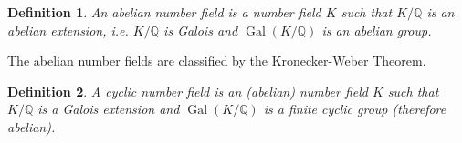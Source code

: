 \documentclass[12pt]{article}
\newtheorem{defn}{Definition}
\theoremstyle{definition}
\newcommand{\Rats}{\mathbb{Q}}
\newcommand{\Gal}{\operatorname{Gal}}
\begin{document}
\begin{defn}
An abelian number field is a number field $K$ such that $K/\Rats$ is an abelian extension, i.e. $K/\Rats$ is Galois and $\Gal(K/\Rats)$ is an abelian group.
\end{defn}

The abelian number fields are classified by the Kronecker-Weber Theorem.

\begin{defn}
A cyclic number field is an (abelian) number field $K$ such that $K/\Rats$ is a Galois extension and $\Gal(K/\Rats)$ is a finite cyclic group (therefore abelian).
\end{defn}
\end{document}
